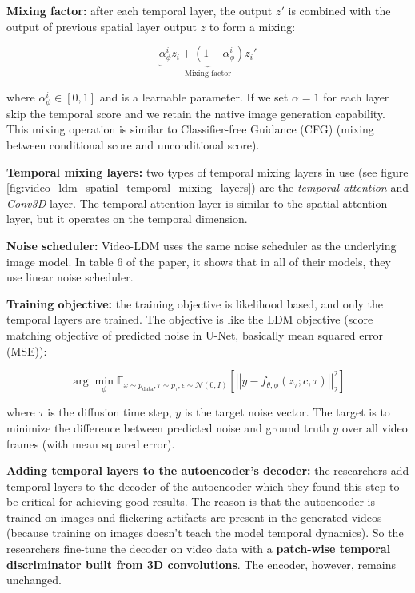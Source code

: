 \textbf{Mixing factor:} after each temporal layer, the output $z'$ is combined with the output of previous spatial layer output $z$ to form a mixing: 

\[ \underbrace{\alpha_\phi^i z_{i} + (1 - \alpha_\phi^i) z_{i}'}_{\text{Mixing factor}} \] 

where $\alpha_\phi^i \in [0, 1]$ and is a learnable parameter. If we set $\alpha = 1$ for each layer skip the temporal score and we retain the native image generation capability. This mixing operation is similar to Classifier-free Guidance (CFG) (mixing between conditional score and unconditional score).

\textbf{Temporal mixing layers:} two types of temporal mixing layers in use (see figure \ref{fig:video_ldm_spatial_temporal_mixing_layers}) are the \textit{temporal attention} and \textit{Conv3D} layer. The temporal attention layer is similar to the spatial attention layer, but it operates on the temporal dimension.

\textbf{Noise scheduler:} Video-LDM uses the same noise scheduler as the underlying image model. In table 6 of the paper, it shows that in all of their models, they use linear noise scheduler.

\textbf{Training objective:} the training objective is likelihood based, and only the temporal layers are trained. The objective is like the LDM objective (score matching objective of predicted noise in U-Net, basically mean squared error (MSE)):

\[ \arg \min_\phi \mathbb{E}_{x \sim p_{\text{data}}, \tau \sim p_{\tau}, \epsilon \sim \mathcal{N} (0, I)} \left[ \left| \left| y - f_{\theta,\phi} (z_{\tau} ; c, \tau) \right| \right|^2_2 \right] \]

where $\tau$ is the diffusion time step, $y$ is the target noise vector. The target is to minimize the difference between predicted noise and ground truth $y$ over all video frames (with mean squared error).

\textbf{Adding temporal layers to the autoencoder's decoder:} the researchers add temporal layers to the decoder of the autoencoder which they found this step to be critical for achieving good results. The reason is that the autoencoder is trained on images and flickering artifacts are present in the generated videos (because training on images doesn't teach the model temporal dynamics). So the researchers fine-tune the decoder on video data with a \textbf{patch-wise temporal discriminator built from 3D convolutions}. The encoder, however, remains unchanged.

